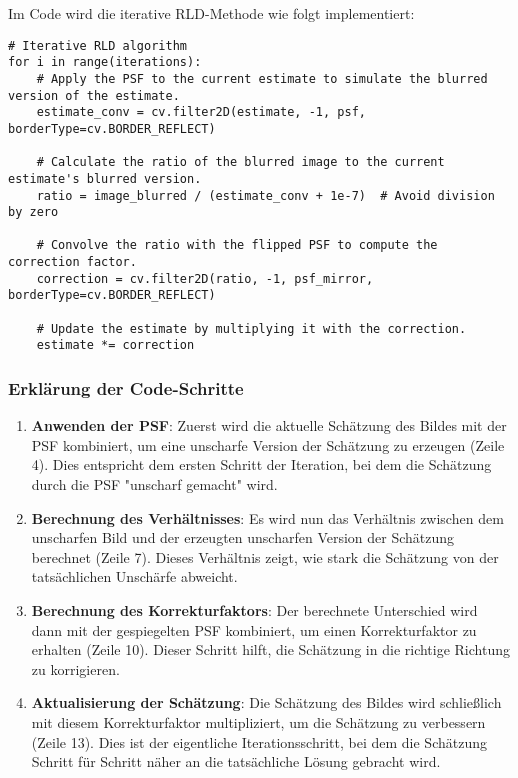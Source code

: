 Im Code wird die iterative RLD-Methode wie folgt implementiert:

\begin{verbatim}
# Iterative RLD algorithm
for i in range(iterations):
    # Apply the PSF to the current estimate to simulate the blurred version of the estimate.
    estimate_conv = cv.filter2D(estimate, -1, psf, borderType=cv.BORDER_REFLECT)
    
    # Calculate the ratio of the blurred image to the current estimate's blurred version.
    ratio = image_blurred / (estimate_conv + 1e-7)  # Avoid division by zero
    
    # Convolve the ratio with the flipped PSF to compute the correction factor.
    correction = cv.filter2D(ratio, -1, psf_mirror, borderType=cv.BORDER_REFLECT)
    
    # Update the estimate by multiplying it with the correction.
    estimate *= correction
\end{verbatim}

\subsubsection{Erklärung der Code-Schritte}

\begin{enumerate}
    \item \textbf{Anwenden der PSF}: Zuerst wird die aktuelle Schätzung des Bildes mit der PSF kombiniert, um eine unscharfe Version der Schätzung zu erzeugen (Zeile 4). Dies entspricht dem ersten Schritt der Iteration, bei dem die Schätzung durch die PSF "unscharf gemacht" wird.
    \item \textbf{Berechnung des Verhältnisses}: Es wird nun das Verhältnis zwischen dem unscharfen Bild und der erzeugten unscharfen Version der Schätzung berechnet (Zeile 7). Dieses Verhältnis zeigt, wie stark die Schätzung von der tatsächlichen Unschärfe abweicht.
    \item \textbf{Berechnung des Korrekturfaktors}: Der berechnete Unterschied wird dann mit der gespiegelten PSF kombiniert, um einen Korrekturfaktor zu erhalten (Zeile 10). Dieser Schritt hilft, die Schätzung in die richtige Richtung zu korrigieren.
    \item \textbf{Aktualisierung der Schätzung}: Die Schätzung des Bildes wird schließlich mit diesem Korrekturfaktor multipliziert, um die Schätzung zu verbessern (Zeile 13). Dies ist der eigentliche Iterationsschritt, bei dem die Schätzung Schritt für Schritt näher an die tatsächliche Lösung gebracht wird.
\end{enumerate}

